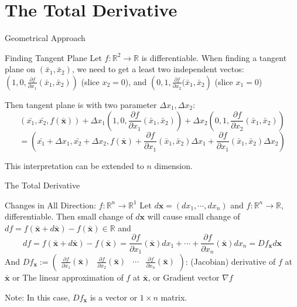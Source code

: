 \documentclass[a4paper,11pt]{article}
\newcommand{\bb}{\mathbb}
\newcommand{\bd}{\mathbf}
\newcommand{\p}{\partial}
\begin{document}
\section{The Total Derivative} %
\label{sec:the_total_derivative}

\begin{frame}[t]{Geometrical Approach}
	\begin{block}{Finding Tangent Plane}
		Let $f:\bb{R}^2\rightarrow \bb{R}$ is differentiable. When finding a tangent plane on $(\bar x_1, \bar x_2)$, we need to get a least two independent vectos: $\left(1,0,\frac{\p f}{\p x_1}(\bar x_1, \bar x_2)\right)$ (slice $x_2=0$), and $\left(0,1,\frac{\p f}{\p x_2}(\bar x_1, \bar x_2\right)$ (slice $x_1=0$)
		
		Then tangent plane is with two parameter $\Delta x_1, \Delta x_2$:\[
			(\bar {x_1}, \bar{x_2}, f(\bar {\bd x})) + \Delta x_1\left(1,0,\frac{\p f}{\p x_1}(\bar x_1, \bar x_2) \right)+\Delta x_2\left(0,1,\frac{\p f}{\p x_2}(\bar x_1, \bar x_2)\right)
		\]\[
			=\left(\bar{ x_1}+\Delta x_1 , \bar{x_2}+\Delta x_2, f(\bar {\bd x})+ \frac{\p f}{\p x_1}(\bar x_1, \bar x_2)\Delta x_1 + \frac{\p f}{\p x_1}(\bar x_1, \bar x_2)\Delta x_2 \right)
		\]
	\end{block}
	This interpretation can be extended to $n$ dimension.
\end{frame}

\begin{frame}[t]{The Total Derivative}
	\begin{block}
		{Changes in All Direction: $f:\bb{R}^n\rightarrow \bb{R}^1$}
		Let $d \bd x = (d x_1, \cdots, d x_n)$ and $f:\bb{R}^n\rightarrow\bb{R}$, differentiable. Then small change of $d\bd x$ will cause small change of $df=f(\bar{\bd x} + d \bar{\bd x}) - f(\bar{\bd x})\in\bb{R}$ and \[
			df = f(\bar{\bd x} + d \bar{\bd x}) - f(\bar{\bd x}) = \frac{\p f}{\p x_1}(\bar{\bd x})dx_1 + \cdots +\frac{\p f}{\p x_n}(\bar{\bd x})dx_n= Df_{\bd x} d\bd x
		\]
		And $Df_{\bd x}:=\begin{pmatrix}
			\frac{\p f}{\p x_1}(\bar{\bd x}) & \frac{\p f}{\p x_2}(\bar{\bd x}) &\cdots & \frac{\p f}{\p x_n}(\bar{\bd x})
		\end{pmatrix}$: (Jacobian) derivative of $f$ at $\bar{\bd x}$ or The linear approximation of $f$ at $\bar{\bd x}$, or Gradient vector $\nabla f$
	\end{block}
	Note: In this case, $Df_{\bd x}$ is a vector or $1\times n$ matrix.
\end{frame}
\end{document}
